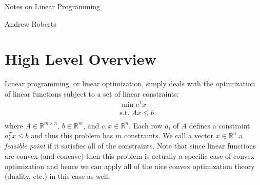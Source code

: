 \documentclass[12pt]{article}
\newcommand{\R}{\mathcal{R}}
\def\R{\mathbb{R}}
\begin{document}
\begin{center}
\Large
Notes on Linear Programming
\end{center}

\begin{flushright}
Andrew Roberts
\end{flushright} 

\section{High Level Overview}
Linear programming, or linear optimization, simply deals with the optimization of linear functions subject to a set of linear constraints: 
\begin{align*}
&\min c^T x \\
&\text{s.t. } Ax \leq b \\
\end{align*}
where $A \in \R^{m \times n}$, $b \in \R^m$, and $c, x \in \R^n$. Each row $a_i$ of $A$ defines a constraint $a_i^T x \leq b$ and thus this problem
has $m$ constraints. We call a vector $x \in \R^n$ a \textit{feasible point} if it satisfies all of the constraints. Note that since linear functions are convex
(and concave) then this problem is actually a specific case of convex optimization and hence we can apply all of the nice convex optimization theory
(duality, etc.) in this case as well. 
\end{document}
